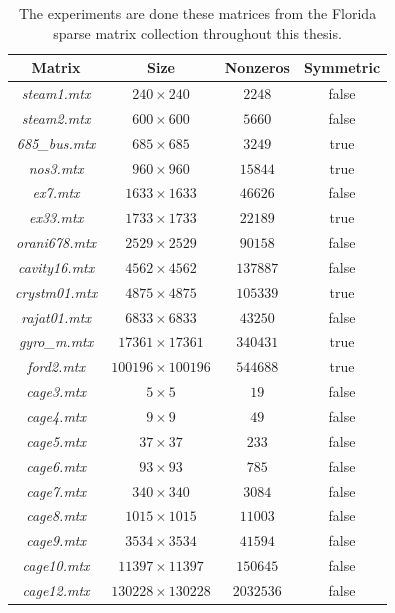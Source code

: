\documentclass[12pt, twoside,a4paper,toc=bibliography]{scrbook}
\begin{document}
\begin{table}
\centering
\begin{tabular}{|c|c|c|c|}
\hline
Matrix & Size & Nonzeros & Symmetric\\\hline
\textit{steam1.mtx} & $240\times 240$ & $2248$ & false\\\hline
\textit{steam2.mtx} & $600\times 600$ & $5660$ & false\\\hline
\textit{685\_bus.mtx} & $685\times 685$ & $3249$ & true\\\hline
\textit{nos3.mtx} & $960\times 960$ & $15844$ & true\\\hline
\textit{ex7.mtx} & $1633\times 1633$ & $46626$ & false\\\hline
\textit{ex33.mtx} & $1733\times 1733$ & $22189$ & true\\\hline
\textit{orani678.mtx} & $2529\times 2529$ & $90158$ & false\\\hline
\textit{cavity16.mtx} & $4562\times 4562$ & $137887$ & false\\\hline
\textit{crystm01.mtx} & $4875\times 4875$ & $105339$ & true\\\hline
\textit{rajat01.mtx} & $6833\times 6833$ & $43250$ & false\\\hline
\textit{gyro\_m.mtx} & $17361\times 17361$ & $340431$ & true\\\hline
\textit{ford2.mtx} & $100196\times 100196$ & $544688$ & true\\\hline
\textit{cage3.mtx} & $5\times 5$ & $19$ & false\\\hline
\textit{cage4.mtx} & $9\times 9$ & $49$ & false\\\hline
\textit{cage5.mtx} & $37\times 37$ & $233$ & false\\\hline
\textit{cage6.mtx} & $93\times 93$ & $785$ & false\\\hline
\textit{cage7.mtx} & $340\times 340$ & $3084$ & false\\\hline
\textit{cage8.mtx} & $1015\times 1015$ & $11003$ & false\\\hline
\textit{cage9.mtx} & $3534\times 3534$ & $41594$ & false\\\hline
\textit{cage10.mtx} & $11397\times 11397$ & $150645$ & false\\\hline
\textit{cage12.mtx} & $130228\times 130228$ & $2032536$ & false\\\hline
\end{tabular}
\caption{The experiments are done these matrices
from the Florida sparse matrix collection throughout this thesis.}
\label{florida.mats}
\end{table}
\end{document}
